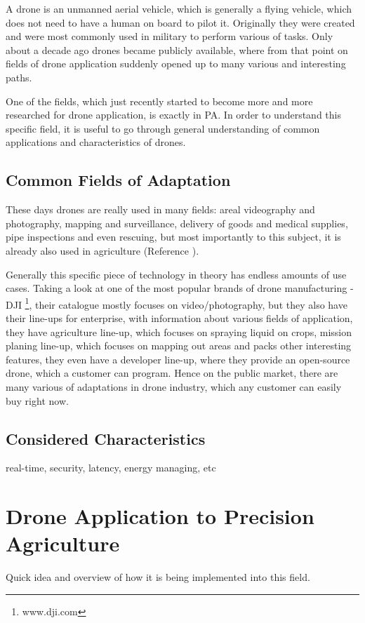 \documentclass[11pt,a5paper,footinclude=true,headinclude=true, oneside]{scrbook}
\begin{document}
A drone is an unmanned aerial vehicle, which is generally a flying vehicle, which does not need to have a human on board to pilot it. Originally they were created and were most commonly used in military to perform various of tasks. Only about a decade ago drones became publicly available, where from that point on fields of drone application suddenly opened up to many various and interesting paths.

One of the fields, which just recently started to become more and more researched for drone application, is exactly in PA. In order to understand this specific field, it is useful to go through general understanding of common applications and characteristics of drones.

\section{Common Fields of Adaptation}

These days drones are really used in many fields: areal videography and photography, mapping and surveillance, delivery of goods and medical supplies, pipe inspections and even rescuing, but most importantly to this subject, it is already also used in agriculture (Reference \cite{alwateer_enabling_2019}). 

Generally this specific piece of technology in theory has endless amounts of use cases. Taking a look at one of the most popular brands of drone manufacturing - DJI \footnote{www.dji.com}, their catalogue mostly focuses on video/photography, but they also have their line-ups for enterprise, with information about various fields of application, they have agriculture line-up, which focuses on spraying liquid on crops, mission planing line-up, which focuses on mapping out areas and packs other interesting features, they even have a developer line-up, where they provide an open-source drone, which a customer can program. Hence on the public market, there are many various of adaptations in drone industry, which any customer can easily buy right now.

\section{Considered Characteristics}

real-time, security, latency, energy managing, etc


\chapter{Drone Application to Precision Agriculture}
Quick idea and overview of how it is being implemented into this field.
    
\end{document}
